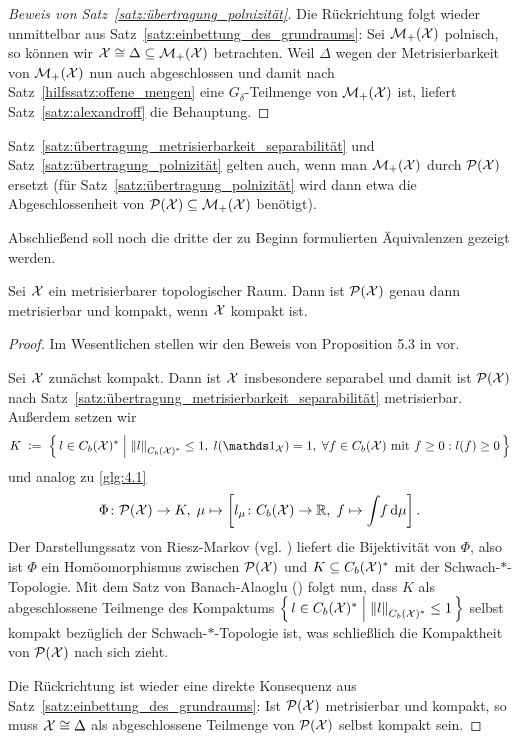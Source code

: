 \documentclass[../thesis/thesis.tex]{subfiles}
\begin{document}
\begin{proof}[Beweis von Satz~\ref{satz:übertragung_polnizität}]
		Die Rückrichtung folgt wieder unmittelbar aus Satz~\ref{satz:einbettung_des_grundraums}: Sei $\mathcal{M}_{+}(\mathcal{X})$ polnisch, 
		so können wir $\mathcal{X} \cong \Delta \subseteq \mathcal{M}_{+}(\mathcal{X})$ betrachten. Weil $\Delta$ wegen der Metrisierbarkeit von $\mathcal{M}_{+}(\mathcal{X})$ nun auch abgeschlossen und damit nach 
		Satz~\ref{hilfssatz:offene_mengen} eine $G_\delta$-Teilmenge von $\mathcal{M}_{+}(\mathcal{X})$ ist, liefert Satz~\ref{satz:alexandroff} die Behauptung.
	\end{proof}

	\begin{Bemerkung}
		Satz~\ref{satz:übertragung_metrisierbarkeit_separabilität} und Satz~\ref{satz:übertragung_polnizität} gelten auch, wenn man $\mathcal{M}_{+}(\mathcal{X})$ durch $\mathcal{P}(\mathcal{X})$ ersetzt 
		(für Satz~\ref{satz:übertragung_polnizität} wird dann etwa die Abgeschlossenheit von $\mathcal{P}(\mathcal{X}) \subseteq \mathcal{M}_{+}(\mathcal{X})$ benötigt).
	\end{Bemerkung}

	Abschließend soll noch die dritte der zu Beginn formulierten Äquivalenzen gezeigt werden.

	\begin{Satz}
		\label{satz:übertragung_kompaktheit}
		Sei $\mathcal{X}$ ein metrisierbarer topologischer Raum. Dann ist $\mathcal{P}(\mathcal{X})$ genau dann metrisierbar und kompakt, wenn $\mathcal{X}$ kompakt ist.
	\end{Satz}
	
	\begin{proof}
		Im Wesentlichen stellen wir den Beweis von Proposition 5.3 in \cite{vanGaans.200203} vor.
		
		Sei $\mathcal{X}$ zunächst kompakt. Dann ist $\mathcal{X}$ insbesondere separabel und damit ist $\mathcal{P}(\mathcal{X})$ 
		nach Satz~\ref{satz:übertragung_metrisierbarkeit_separabilität} metrisierbar.
		Außerdem setzen wir
		\[ K \; \defby \; \setcomp{l \in \Bdcontfct{\X}^\ast}{\norm{l}_{\Bdcontfct{\X}^\ast} \leq 1, \; l(\indfct_{\X}) = 1, \; 
			\forall f \in \Bdcontfct{\X} \text{ mit } f \geq 0 : l(f) \geq 0}\]
		und analog zu \eqref{glg:4.1}
		\[ \Phi \colon \mathcal{P}(\mathcal{X}) \to K, \; \mu \mapsto \left[l_\mu \colon C_b(\mathcal{X}) \to \mathbb{R}, \; f \mapsto \int_{} \, f \, \mathrm{d}\mu \right]  \text{.} \]
		Der Darstellungssatz von Riesz-Markov (vgl. \cite[Theorem 4.8.8]{Simon.2015}) liefert die Bijektivität von $\Phi$, also ist $\Phi$ ein 
		Homöomorphismus zwischen $\mathcal{P}(\mathcal{X})$ und $K \subseteq C_b(\mathcal{X})^\ast$ 
		mit der Schwach-$\ast$-Topologie. Mit dem Satz von Banach-Alaoglu (\cite[Theorem 5.8.1]{Simon.2015}) folgt nun, dass $K$ als abgeschlossene Teilmenge des Kompaktums 
		$\left\{\, l \in C_b(\mathcal{X})^\ast \; \middle| \; \left\lVert l\right\rVert_{C_b(\mathcal{X})^\ast} \leq 1 \,\right\}$ selbst kompakt bezüglich der Schwach-$\ast$-Topologie ist, 
		was schließlich die Kompaktheit von $\mathcal{P}(\mathcal{X})$ nach sich zieht.
		
		Die Rückrichtung ist wieder eine direkte Konsequenz aus Satz~\ref{satz:einbettung_des_grundraums}: Ist $\mathcal{P}(\mathcal{X})$ metrisierbar und kompakt, so muss 
		$\mathcal{X} \cong \Delta$ als abgeschlossene Teilmenge von $\mathcal{P}(\mathcal{X})$ selbst kompakt sein.
	\end{proof}
\end{document}
